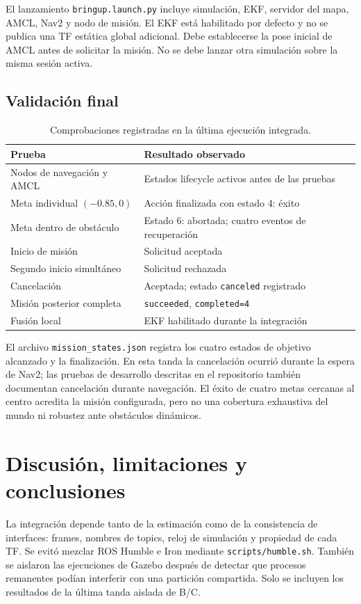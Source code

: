 \documentclass[11pt,a4paper]{article}
\newcommand{\archivo}[1]{\nolinkurl{#1}}
\begin{document}
El lanzamiento \archivo{bringup.launch.py} incluye simulación, EKF, servidor del mapa, AMCL, Nav2 y nodo de misión. El EKF está habilitado por defecto y no se publica una TF estática global adicional. Debe establecerse la pose inicial de AMCL antes de solicitar la misión. No se debe lanzar otra simulación sobre la misma sesión activa.

\subsection{Validación final}
\begin{table}[H]\centering\caption{Comprobaciones registradas en la última ejecución integrada.}
\begin{tabularx}{\linewidth}{lX}\toprule
Prueba & Resultado observado\\\midrule
Nodos de navegación y AMCL & Estados lifecycle activos antes de las pruebas\\
Meta individual $(-0.85,0)$ & Acción finalizada con estado 4: éxito\\
Meta dentro de obstáculo & Estado 6: abortada; cuatro eventos de recuperación\\
Inicio de misión & Solicitud aceptada\\
Segundo inicio simultáneo & Solicitud rechazada\\
Cancelación & Aceptada; estado \archivo{canceled} registrado\\
Misión posterior completa & \archivo{succeeded}, \archivo{completed=4}\\
Fusión local & EKF habilitado durante la integración\\\bottomrule
\end{tabularx}\end{table}
El archivo \archivo{mission_states.json} registra los cuatro estados de objetivo alcanzado y la finalización. En esta tanda la cancelación ocurrió durante la espera de Nav2; las pruebas de desarrollo descritas en el repositorio también documentan cancelación durante navegación. El éxito de cuatro metas cercanas al centro acredita la misión configurada, pero no una cobertura exhaustiva del mundo ni robustez ante obstáculos dinámicos.

\section{Discusión, limitaciones y conclusiones}
La integración depende tanto de la estimación como de la consistencia de interfaces: frames, nombres de topics, reloj de simulación y propiedad de cada TF. Se evitó mezclar ROS Humble e Iron mediante \archivo{scripts/humble.sh}. También se aislaron las ejecuciones de Gazebo después de detectar que procesos remanentes podían interferir con una partición compartida. Solo se incluyen los resultados de la última tanda aislada de B/C.
\end{document}
